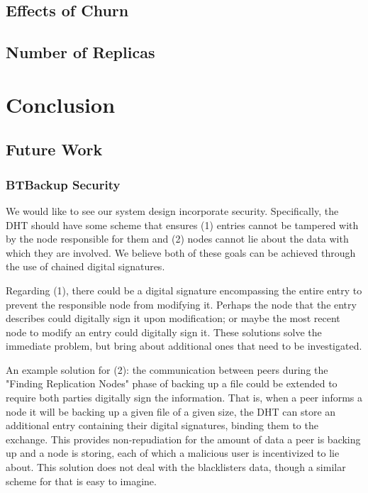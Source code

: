 \documentclass[12pt]{report}
\begin{document}
\section{Effects of Churn}

\section{Number of Replicas}

\chapter{Conclusion} \label{chap:Conclusion}


\section{Future Work}

\subsection{BTBackup Security} \label{subsec:BTBackupSecurity}

We would like to see our system design incorporate security. Specifically, the DHT should have some scheme that ensures (1) entries cannot be tampered with by the node responsible for them and (2) nodes cannot lie about the data with which they are involved. We believe both of these goals can be achieved through the use of chained digital signatures.

Regarding (1), there could be a digital signature encompassing the entire entry to prevent the responsible node from modifying it. Perhaps the node that the entry describes could digitally sign it upon modification; or maybe the most recent node to modify an entry could digitally sign it. These solutions solve the immediate problem, but bring about additional ones that need to be investigated.

An example solution for (2): the communication between peers during the "Finding Replication Nodes" phase of backing up a file could be extended to require both parties digitally sign the information. That is, when a peer informs a node it will be backing up a given file of a given size, the DHT can store an additional entry containing their digital signatures, binding them to the exchange. This provides non-repudiation for the amount of data a peer is backing up and a node is storing, each of which a malicious user is incentivized to lie about. This solution does not deal with the blacklisters data, though a similar scheme for that is easy to imagine.
\end{document}
